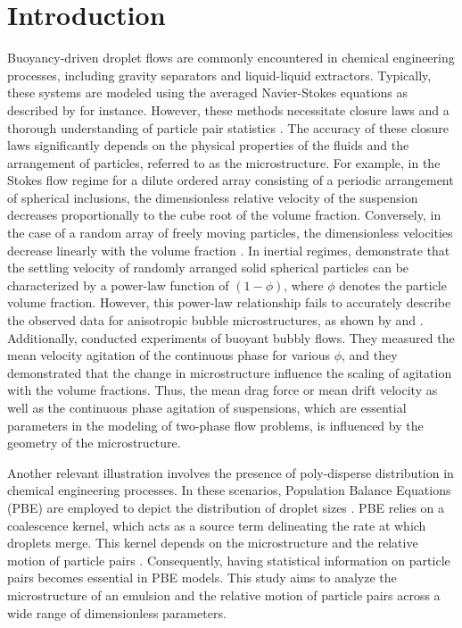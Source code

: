 \documentclass[11pt]{My_preprint}
\begin{document}
\section{Introduction}
Buoyancy-driven droplet flows are commonly encountered in chemical engineering processes, including gravity separators and liquid-liquid extractors. Typically, these systems are modeled using the averaged Navier-Stokes equations as described by \citep{castellano2019} for instance. However, these methods necessitate closure laws and a thorough understanding of particle pair statistics \citep{simonin1996}. The accuracy of these closure laws significantly depends on the physical properties of the fluids and the arrangement of particles, referred to as the microstructure. For example, in the Stokes flow regime for a dilute ordered array consisting of a periodic arrangement of spherical inclusions, the dimensionless relative velocity of the suspension decreases proportionally to the cube root of the volume fraction. Conversely, in the case of a random array of freely moving particles, the dimensionless velocities decrease linearly with the volume fraction \citep{saffman1973}.
In inertial regimes, \citet{yin2007} demonstrate that the settling velocity of randomly arranged solid spherical particles can be characterized by a power-law function of $(1-\phi)$, where $\phi$ denotes the particle volume fraction.
However, this power-law relationship fails to accurately describe the observed data for anisotropic bubble microstructures, as shown by \citet{yin2008lattice} and \citet{loisy2017}.
Additionally, \citet{cartellier2009induced} conducted experiments of buoyant bubbly flows. 
They measured the mean velocity agitation of the continuous phase for various $\phi$, 
and they demonstrated that the change in microstructure influence the scaling of agitation with the volume fractions. 
Thus, the mean drag force or mean drift velocity as well as the continuous phase agitation of suspensions, which are essential parameters in the modeling of two-phase flow problems, is influenced by the geometry of the microstructure.






Another relevant illustration involves the presence of poly-disperse distribution in chemical engineering processes. In these scenarios, Population Balance Equations (PBE) are employed to depict the distribution of droplet sizes \citep{randolph2012theory}. PBE relies on a coalescence kernel, which acts as a source term delineating the rate at which droplets merge. This kernel depends on the microstructure and the relative motion of particle pairs \citep{chesters1991modelling}. Consequently, having statistical information on particle pairs becomes essential in PBE models. This study aims to analyze the microstructure of an emulsion and the relative motion of particle pairs across a wide range of dimensionless parameters.
\end{document}
